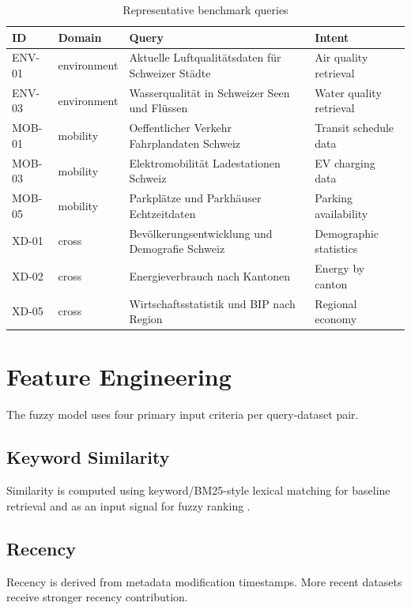 \documentclass[11pt,a4paper]{article}
\begin{document}
\begin{table}[H]
\centering
\begin{tabular}{p{} p{} p{} p{}}
\toprule
\textbf{ID} & \textbf{Domain} & \textbf{Query} & \textbf{Intent} \\
\midrule
ENV-01 & environment & Aktuelle Luftqualit\"atsdaten f\"ur Schweizer St\"adte & Air quality retrieval \\
ENV-03 & environment & Wasserqualit\"at in Schweizer Seen und Fl\"ussen & Water quality retrieval \\
MOB-01 & mobility & Oeffentlicher Verkehr Fahrplandaten Schweiz & Transit schedule data \\
MOB-03 & mobility & Elektromobilit\"at Ladestationen Schweiz & EV charging data \\
MOB-05 & mobility & Parkpl\"atze und Parkh\"auser Echtzeitdaten & Parking availability \\
XD-01 & cross & Bev\"olkerungsentwicklung und Demografie Schweiz & Demographic statistics \\
XD-02 & cross & Energieverbrauch nach Kantonen & Energy by canton \\
XD-05 & cross & Wirtschaftsstatistik und BIP nach Region & Regional economy \\
\bottomrule
\end{tabular}
\caption{Representative benchmark queries}
\label{tab:queries}
\end{table}

\section{Feature Engineering}

The fuzzy model uses four primary input criteria per query-dataset pair.

\subsection{Keyword Similarity}

Similarity is computed using keyword/BM25-style lexical matching for baseline retrieval and as an input signal for fuzzy ranking \citep{robertson2009,manning2008}.

\subsection{Recency}

Recency is derived from metadata modification timestamps. More recent datasets receive stronger recency contribution.
\end{document}
